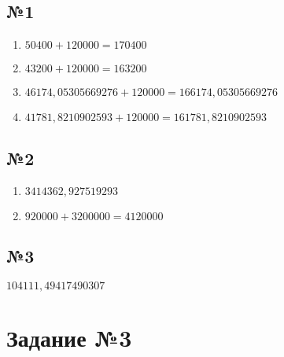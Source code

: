 \documentclass[a4paper, 12pt]{article}
\begin{document}
	\subsection{№1}
	\begin{enumerate}
		\item $50 400 + 120 000 = 170 400$
		\item $43 200 + 120 000 = 163 200$
		\item $46 174,05305669276 + 120 000 = 166 174,05305669276$
		\item $41 781,8210902593 + 120 000 = 161 781,8210902593$
	\end{enumerate}
	\subsection{№2}
	\begin{enumerate}
		\item $3 414 362,927519293$
		\item $920 000 + 3 200 000 = 4 120 000$
	\end{enumerate}
	\subsection{№3}
	$104 111,49417490307$
	\section{Задание №3}
	
\end{document}

